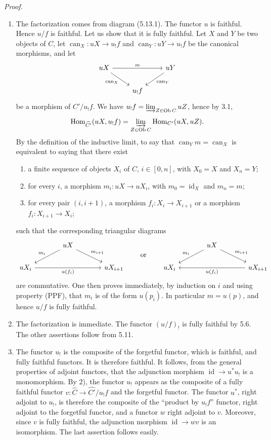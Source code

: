 \documentclass[11pt]{article}
\newcommand{\Ob}{\operatorname{Ob}}
\newcommand{\Hom}{\operatorname{Hom}}
\newcommand{\id}{\operatorname{id}}
\newcommand{\can}{\operatorname{can}}
\newenvironment{proofsketch}{\par\noindent\emph{Proof.}\ }{\par\medskip}
\begin{document}
\begin{proofsketch}
\begin{enumerate}[label=\arabic*)]
\item The factorization comes from diagram (5.13.1). The functor $u$ is faithful. Hence $u/f$ is faithful. Let us show that it is fully faithful. Let $X$ and $Y$ be two objects of $C$, let $\can_X:uX\to u_!f$ and $\can_Y:uY\to u_!f$ be the canonical morphisms, and let
\[
\begin{tikzcd}
uX\arrow[rr,"m"]\arrow[dr,"\can_X"']&&uY\arrow[dl,"\can_Y"]\\
&u_!f&
\end{tikzcd}
\]
be a morphism of $C'/u_!f$. We have $u_!f=\varinjlim_{Z\in\Ob C}uZ$, hence by 3.1,
\[
\Hom_{\widehat{C'}}(uX,u_!f)=\varinjlim_{Z\in\Ob C}\Hom_{C'}(uX,uZ).
\]
By the definition of the inductive limit, to say that $\can_Ym=\can_X$ is equivalent to saying that there exist
\begin{enumerate}[label=\alph*)]
\item a finite sequence of objects $X_i$ of $C$, $i\in[0,n]$, with $X_0=X$ and $X_n=Y$;
\item for every $i$, a morphism $m_i:uX\to uX_i$, with $m_0=\id_X$ and $m_n=m$;
\item for every pair $(i,i+1)$, a morphism $f_i:X_i\to X_{i+1}$ or a morphism $f_i:X_{i+1}\to X_i$;
\end{enumerate}
such that the corresponding triangular diagrams
\[
\begin{tikzcd}[column sep=large]
&uX\arrow[dl,"m_i"']\arrow[dr,"m_{i+1}"]&\\
uX_i\arrow[rr,"u(f_i)"']&&uX_{i+1}
\end{tikzcd}
\qquad\text{or}\qquad
\begin{tikzcd}[column sep=large]
&uX\arrow[dl,"m_i"']\arrow[dr,"m_{i+1}"]&\\
uX_i&&uX_{i+1}\arrow[ll,"u(f_i)"]
\end{tikzcd}
\]
are commutative. One then proves immediately, by induction on $i$ and using property (PPF), that $m_i$ is of the form $u(p_i)$. In particular $m=u(p)$, and hence $u/f$ is fully faithful.
\item The factorization is immediate. The functor $(u/f)_!$ is fully faithful by 5.6. The other assertions follow from 5.11.
\item The functor $u_!$ is the composite of the forgetful functor, which is faithful, and fully faithful functors. It is therefore faithful. It follows, from the general properties of adjoint functors, that the adjunction morphism $\id\to u^*u_!$ is a monomorphism. By 2), the functor $u_!$ appears as the composite of a fully faithful functor $v:\widehat C\to\widehat{C'}/u_!f$ and the forgetful functor. The functor $u^*$, right adjoint to $u_!$, is therefore the composite of the ``product by $u_!f$'' functor, right adjoint to the forgetful functor, and a functor $w$ right adjoint to $v$. Moreover, since $v$ is fully faithful, the adjunction morphism $\id\to wv$ is an isomorphism. The last assertion follows easily.
\end{enumerate}
\end{proofsketch}
\end{document}
